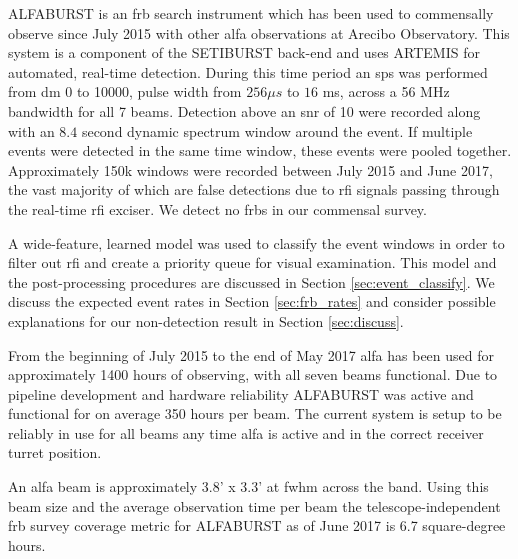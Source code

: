 \documentclass[a4paper,fleqn,usenatbib]{mnras}
\begin{document}
ALFABURST is an \gls*{frb} search instrument which has been used to commensally
observe since July 2015 with other \gls*{alfa} observations at Arecibo
Observatory. This system is a component of the SETIBURST back-end
\citep{2017ApJS..228...21C} and uses ARTEMIS \citep{2015MNRAS.452.1254K} for
automated, real-time detection. During this time period an \gls*{sps} was
performed from \gls*{dm} 0 to 10000, pulse width from $256 \mu s$ to $16$ ms,
across a 56 MHz bandwidth for all 7 beams. Detection above an \gls*{snr} of 10
were recorded along with an $8.4$ second dynamic spectrum window around the
event. If multiple events were detected in the same time window, these events
were pooled together.  Approximately 150k windows were recorded between July
2015 and June 2017, the vast majority of which are false detections due to
\gls*{rfi} signals passing through the real-time \gls*{rfi} exciser. We detect
no \glspl*{frb} in our commensal survey.

A wide-feature, learned model was used to classify the event windows in order to
filter out \gls*{rfi} and create a priority queue for visual examination. This
model and the post-processing procedures are discussed in Section
\ref{sec:event_classify}. We discuss the expected event rates in Section
\ref{sec:frb_rates} and consider possible explanations for our non-detection
result in Section \ref{sec:discuss}.


From the beginning of July 2015 to the end of May 2017 \gls*{alfa} has been used
for approximately 1400 hours of observing, with all seven beams functional. Due
to pipeline development and hardware reliability ALFABURST was active and
functional for on average 350 hours per beam.  The current system is setup to be
reliably in use for all beams any time \gls*{alfa} is active and in the correct
receiver turret position.

An \gls*{alfa} beam is approximately 3.8' x 3.3' at \gls*{fwhm} across the band.
Using this beam size and the average observation time per beam the
telescope-independent \gls*{frb} survey coverage metric for ALFABURST as of June
2017 is 6.7 square-degree hours.


\end{document}
